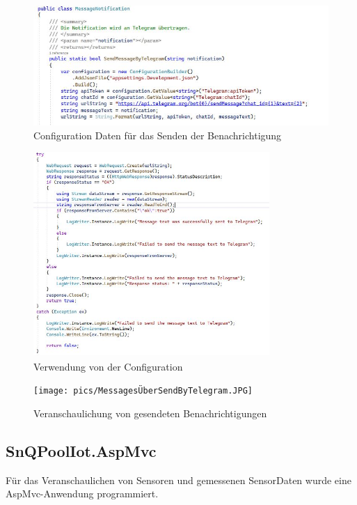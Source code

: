 \begin{figure}[H]
    \centering
    \includegraphics[width=1.1\textwidth]{pics/MessageTelegramConfiguration.JPG}  
    \caption{Configuration Daten für das Senden der Benachrichtigung}
\end{figure}

\begin{figure}[H]
    \centering
    \includegraphics[width=0.8\textwidth]{pics/MessageTelegramUsage.JPG}  
    \caption{Verwendung von der Configuration}
\end{figure}

\begin{figure}[H]
    \centering
    \texttt{[image: pics/MessagesÜberSendByTelegram.JPG]}  
    \caption{Veranschaulichung von gesendeten Benachrichtigungen}
\end{figure}


\subsection{SnQPoolIot.AspMvc}

Für das Veranschaulichen von Sensoren und gemessenen SensorDaten wurde eine AspMvc-Anwendung programmiert.

